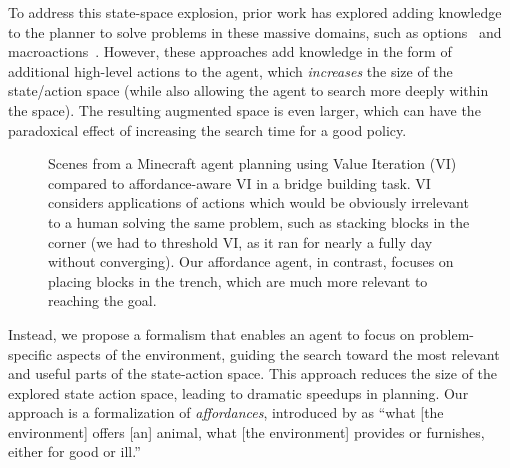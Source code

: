 \documentclass[]{article}
\begin{document}
To address this state-space explosion, prior work has explored adding
knowledge to the planner to solve problems in these
massive domains, such as options~\citep{sutton99} and
macroactions~\citep{Botea:2005kx,Newton:2005vn}. However, these
approaches add knowledge in the form of additional high-level actions
to the agent, which {\em increases} the size of the state/action space
(while also allowing the agent to search more deeply within the
space).  The resulting augmented space is even larger, which can have
the paradoxical effect of increasing the search time for a good
policy.

\begin{figure}
\centering
%
%
  \caption{Scenes from a Minecraft agent planning using Value
    Iteration (VI) compared to affordance-aware VI in a bridge
    building task.  VI considers applications of actions which would be obviously
    irrelevant to a human solving the same problem, such as stacking
    blocks in the corner (we had to threshold VI, as it ran for nearly a fully day without converging).
     Our affordance agent, in contrast, focuses
    on placing blocks in the trench, which are much more relevant to
    reaching the goal.\label{fig:minecraft}}
\end{figure}

Instead, we propose a formalism that enables an agent to focus on
problem-specific aspects of the environment, guiding the search toward
the most relevant and useful parts of the state-action space.  This
approach reduces the size of the explored state action space, leading
to dramatic speedups in planning.  Our approach is a formalization of
{\em affordances}, introduced by \citet{gibson77} as ``what [the
  environment] offers [an] animal, what [the environment] provides or
furnishes, either for good or ill.''
      
\end{document}
